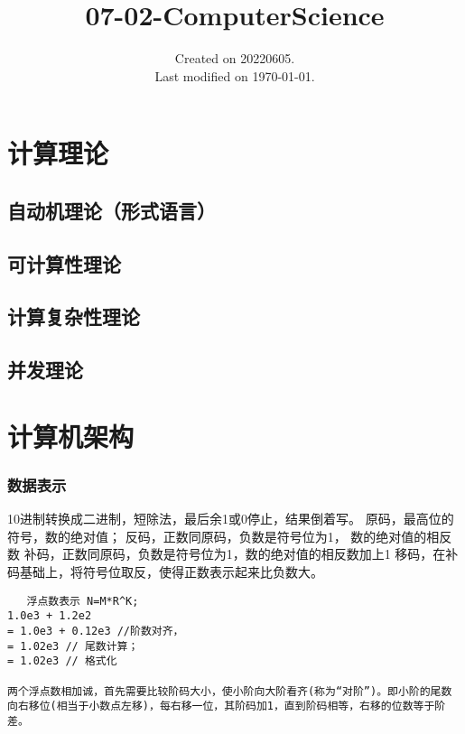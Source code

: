 \documentclass[UTF8]{../computerUniverse}
\begin{document}
\title{07-02-ComputerScience}
\date{Created on 20220605.\\   Last modified on \today.}
\maketitle
\tableofcontents



\chapter{计算理论}

\section{自动机理论（形式语言）}


\section{可计算性理论}
\section{计算复杂性理论}
\section{并发理论}



\chapter{计算机架构}







\subsection{数据表示}

10进制转换成二进制，短除法，最后余1或0停止，结果倒着写。
原码，最高位的符号，数的绝对值；
反码，正数同原码，负数是符号位为1， 数的绝对值的相反数
补码，正数同原码，负数是符号位为1，数的绝对值的相反数加上1
移码，在补码基础上，将符号位取反，使得正数表示起来比负数大。


\begin{lstlisting}
   浮点数表示 N=M*R^K;
1.0e3 + 1.2e2
= 1.0e3 + 0.12e3 //阶数对齐，
= 1.02e3 // 尾数计算；
= 1.02e3 // 格式化

两个浮点数相加诚，首先需要比较阶码大小，使小阶向大阶看齐(称为“对阶”)。即小阶的尾数向右移位(相当于小数点左移)，每右移一位，其阶码加1，直到阶码相等，右移的位数等于阶差。

\end{lstlisting}
\end{document}
